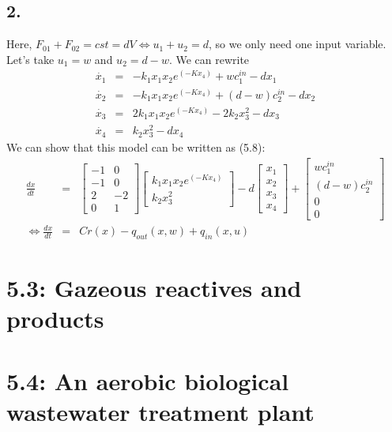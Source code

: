 \subsection*{2.}
Here, $F_{01}+F_{02} = cst = dV \Leftrightarrow u_1 + u_2 = d$, so we only need one input variable. Let's take $u_1=w$ and $u_2=d-w$. We can rewrite
\begin{eqnarray*}
\dot{x_1} &=& -k_1x_1x_2e^{(-Kx_4)} + w c_1^{in} - d x_1 \\
\dot{x_2} &=& -k_1x_1x_2e^{(-Kx_4)} + (d-w) c_2^{in} - dx_2 \\
\dot{x_3} &=& 2k_1x_1x_2e^{(-Kx_4)} - 2k_2x_3^2 - dx_3 \\
\dot{x_4} &=& k_2x_3^2 - dx_4
\end{eqnarray*}
We can show that this model can be written as (5.8):
\begin{eqnarray*}
\frac{dx}{dt} &=& \begin{bmatrix}
-1 & 0 \\
-1 & 0 \\
2 & -2 \\
0 & 1
\end{bmatrix}
\begin{bmatrix}
k_1x_1x_2e^{(-Kx_4)} \\
k_2x_3^2
\end{bmatrix} - d\begin{bmatrix}
x_1\\
x_2\\
x_3\\
x_4
\end{bmatrix} + \begin{bmatrix}
w c_1^{in} \\
(d-w) c_2^{in}\\
0\\
0
\end{bmatrix}  \\
\Leftrightarrow \frac{dx}{dt} &=& C r(x) - q_{out}(x,w) + q_{in}(x,u)
\end{eqnarray*}




\section*{5.3: Gazeous reactives and products}

\section*{5.4: An aerobic biological wastewater treatment plant}





